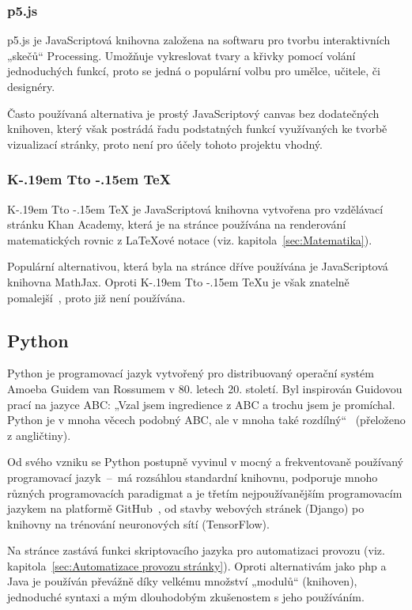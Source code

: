 \documentclass[a4paper, 12pt]{article}
\makeatletter
\DeclareRobustCommand{\KaTeX}{%
  K\kern -.19em
  {\sbox \z@ T\vbox to\ht \z@ {\hbox{%
  \check@mathfonts
  \fontsize\sf@size\z@
  \selectfont A}%
  \vss}%
}\kern -.15em
\TeX}
\makeatother
\begin{document}
  \subsubsection{p5.js} \label{sec:p5.js}
  p5.js je JavaScriptová knihovna založena na softwaru pro tvorbu interaktivních „skečů“ Processing. Umožňuje vykreslovat tvary a křivky pomocí volání jednoduchých funkcí, proto se jedná o populární volbu pro umělce, učitele, či designéry.

  Často používaná alternativa je prostý JavaScriptový canvas bez dodatečných knihoven, který však postrádá řadu podstatných funkcí využívaných ke tvorbě vizualizací stránky, proto není pro účely tohoto projektu vhodný.


  \subsubsection{\texorpdfstring{\KaTeX}{KaTeX}} \label{sec:KaTeX}
  \KaTeX{} je JavaScriptová knihovna vytvořena pro vzdělávací stránku Khan Academy, která je na stránce používána na renderování matematických rovnic z \LaTeX ové notace (viz. kapitola~\ref{sec:Matematika}).

  Populární alternativou, která byla na stránce dříve používána je JavaScriptová knihovna MathJax. Oproti \KaTeX u je však znatelně pomalejší~\cite{katex-mathjax-comparison}, proto již není používána.


  \subsection{Python} \label{sec:Python}
  Python je programovací jazyk vytvořený pro distribuovaný operační systém Amoeba Guidem van Rossumem v 80. letech 20. století. Byl inspirován Guidovou prací na jazyce ABC: „Vzal jsem ingredience z ABC a trochu jsem je promíchal. Python je v mnoha věcech podobný ABC, ale v mnoha také rozdílný“~\cite{making-of-python} (přeloženo z angličtiny).

  Od svého vzniku se Python postupně vyvinul v mocný a frekventovaně používaný programovací jazyk~--~má rozsáhlou standardní knihovnu, podporuje mnoho různých programovacích paradigmat a je třetím nejpoužívanějším programovacím jazykem na platformě GitHub~\cite{github-statistics}, od stavby webových stránek (Django) po knihovny na trénování neuronových sítí (TensorFlow).

  Na stránce zastává funkci skriptovacího jazyka pro automatizaci provozu (viz. kapitola~\ref{sec:Automatizace provozu stránky}). Oproti alternativám jako \gls{php} a Java je používán převážně díky velkému množství „modulů“ (knihoven), jednoduché syntaxi a mým dlouhodobým zkušenostem s jeho používáním.
\end{document}
